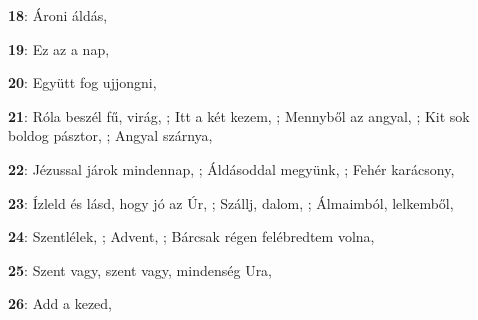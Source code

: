 \begin{minipage}{0.5\textwidth}
\textbf{18}: Ároni áldás, \pageref{C381roniC3A1ldC3A1s}
\end{minipage}\vspace{0.1cm}
\begin{minipage}{0.5\textwidth}
\textbf{19}: Ez az a nap, \pageref{Ezazanap}
\end{minipage}\vspace{0.1cm}
\begin{minipage}{0.5\textwidth}
\textbf{20}: Együtt fog ujjongni, \pageref{EgyC3BCttfogujjongni}
\end{minipage}\vspace{0.1cm}
\begin{minipage}{0.5\textwidth}
\textbf{21}: Róla beszél fű, virág, \pageref{RC3B3labeszC3A9lfC5B12CvirC3A1g}; Itt a két kezem, \pageref{IttakC3A9tkezem}; Mennyből az angyal, \pageref{MennybC591lazangyal}; Kit sok boldog pásztor, \pageref{KitsokboldogpC3A1sztor}; Angyal szárnya, \pageref{AngyalszC3A1rnya}
\end{minipage}\vspace{0.1cm}
\begin{minipage}{0.5\textwidth}
\textbf{22}: Jézussal járok mindennap, \pageref{JC3A9zussaljC3A1rokmindennap}; Áldásoddal megyünk, \pageref{C381ldC3A1soddalmegyC3BCnk}; Fehér karácsony, \pageref{FehC3A9rkarC3A1csony}
\end{minipage}\vspace{0.1cm}
\begin{minipage}{0.5\textwidth}
\textbf{23}: Ízleld és lásd, hogy jó az Úr, \pageref{C38DzleldC3A9slC3A1sd2ChogyjC3B3azC39Ar}; Szállj, dalom, \pageref{SzC3A1llj2Cdalom}; Álmaimból, lelkemből, \pageref{C381lmaimbC3B3l2ClelkembC591l}
\end{minipage}\vspace{0.1cm}
\begin{minipage}{0.5\textwidth}
\textbf{24}: Szentlélek, \pageref{SzentlC3A9lek}; Advent, \pageref{Advent}; Bárcsak régen felébredtem volna, \pageref{BC3A1rcsakrC3A9genfelC3A9bredtemvolna}
\end{minipage}\vspace{0.1cm}
\begin{minipage}{0.5\textwidth}
\textbf{25}: Szent vagy, szent vagy, mindenség Ura, \pageref{Szentvagy2Cszentvagy2CmindensC3A9gUra}
\end{minipage}\vspace{0.1cm}
\begin{minipage}{0.5\textwidth}
\textbf{26}: Add a kezed, \pageref{Addakezed}
\end{minipage}\vspace{0.1cm}
